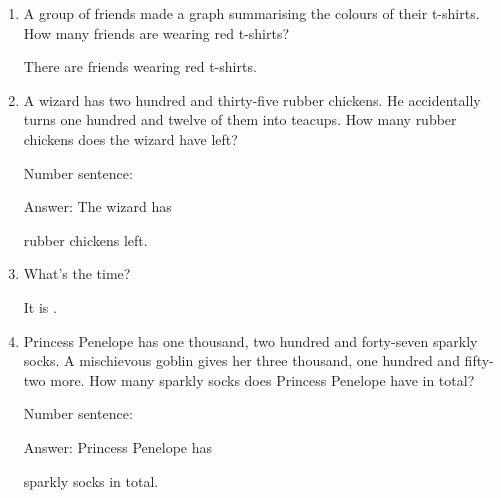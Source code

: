 \documentclass{tufte-book}
\begin{document}
\begin{enumerate}

\item {}
A group of friends made a graph summarising the colours of their t-shirts.
How many friends are wearing red t-shirts?\medskip

There are \dotfill\medskip
friends wearing red t-shirts.

\item
  A wizard has two hundred and thirty-five rubber chickens. He
  accidentally turns one hundred and twelve of them into teacups. How
  many rubber chickens does the wizard have left?\medskip\par
  Number sentence:
  \dotfill\medskip\par
  Answer: The wizard has
  \dotfill\medskip\par\mbox{}\dotfill\medskip\par\mbox{}\dotfill\bigskip
  rubber chickens left.

\item {}
What's the time?\medskip

It is \dotfill\medskip.

\item
  Princess Penelope has one thousand, two hundred and forty-seven
  sparkly socks. A mischievous goblin gives her three thousand, one
  hundred and fifty-two more. How many sparkly socks does Princess
  Penelope have in total?\medskip\par
  Number sentence:
  \dotfill\medskip\par
  Answer: Princess Penelope has
  \dotfill\medskip\par\mbox{}\dotfill\medskip\par\mbox{}\dotfill\bigskip
  sparkly socks in total.


\end{enumerate}
\end{document}
